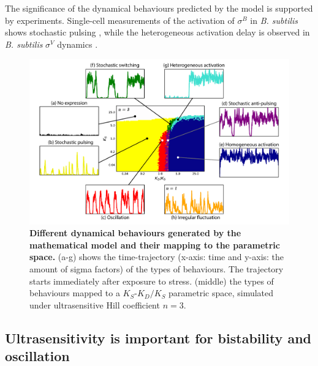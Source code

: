 The significance of the dynamical behaviours predicted by
the model is supported by experiments.
Single-cell measurements of the activation of $\sigma^B$ in
\textit{B. subtilis} shows stochastic pulsing \cite{locke11,cabeen17},
while the heterogeneous activation delay is observed in
\textit{B. subtilis} $\sigma^V$ dynamics \cite{schwall21a}.

\begin{figure}[ht]
    \centering
    \includegraphics[width = 6in]{different_behaviours.pdf}
    \caption[
        Different dynamical behaviours generated by the mathematical
        model and their mapping to the parametric space
        ]{
        \textbf{Different dynamical behaviours generated by the mathematical
        model and their mapping to the parametric space.}
        (a-g) shows the time-trajectory (x-axis: time and y-axis:
        the amount of sigma factors) of the types of behaviours.
        The trajectory starts immediately after exposure to stress.
        (middle) the types of behaviours mapped to a 
        $K_S$-$K_D/K_S$ parametric space,
        simulated under ultrasensitive Hill coefficient $n = 3$.
    }
    \label{fig:different_behaviours}
\end{figure}

\subsection{Ultrasensitivity is important for bistability and oscillation}
\label{sec:us_for_bs_and_oscillation}

